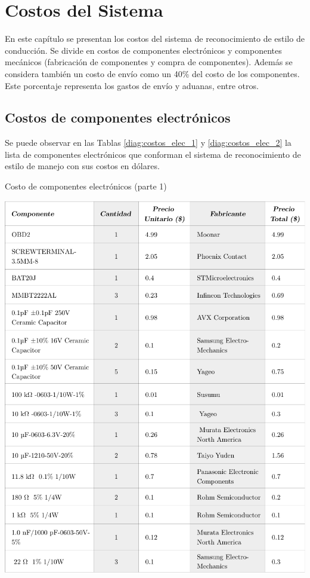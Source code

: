 \chapter{Costos del Sistema}

 \graphicspath{{Chapter6/Figuras/}{Chapter6/Figs/PDF/}{Chapter4/Figs/}}

En este capítulo se presentan los costos del sistema de reconocimiento de estilo de conducción. Se divide en costos de componentes electrónicos y componentes mecánicos (fabricación de componentes y compra de componentes). Además se considera también un costo de envío como un 40\% del costo de los componentes. Este porcentaje representa los gastos de envío y aduanas, entre otros.

\section{Costos de componentes electrónicos}

Se puede observar en las Tablas \ref{diag:costos_elec_1} y \ref{diag:costos_elec_2} la lista de componentes electrónicos que conforman el sistema de reconocimiento de estilo de manejo con sus costos en dólares.

\begin{table}[htbp!]
  \centering
  \caption{Costo de componentes electrónicos (parte 1)}
  \label{diag:costos_elec_1}
  \includegraphics[width=0.9\linewidth]{BOM_1.pdf}
\end{table}

